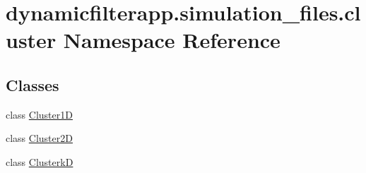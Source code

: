 \hypertarget{namespacedynamicfilterapp_1_1simulation__files_1_1cluster}{}\section{dynamicfilterapp.\+simulation\+\_\+files.\+cluster Namespace Reference}
\label{namespacedynamicfilterapp_1_1simulation__files_1_1cluster}
\subsection*{Classes}
\begin{DoxyCompactItemize}
\item 
class \hyperlink{classdynamicfilterapp_1_1simulation__files_1_1cluster_1_1_cluster1_d}{Cluster1D}
\item 
class \hyperlink{classdynamicfilterapp_1_1simulation__files_1_1cluster_1_1_cluster2_d}{Cluster2D}
\item 
class \hyperlink{classdynamicfilterapp_1_1simulation__files_1_1cluster_1_1_clusterk_d}{ClusterkD}
\end{DoxyCompactItemize}
